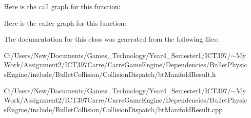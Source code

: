 Here is the call graph for this function:

Here is the caller graph for this function:

The documentation for this class was generated from the following files:\begin{CompactItemize}
\item 
C:/Users/New/Documents/Games\_\-Technology/Year4\_\-Semester1/ICT397/$\sim$My Work/Assignment2/ICT397Carre/CarreGameEngine/Dependencies/BulletPhysicsEngine/include/BulletCollision/CollisionDispatch/btManifoldResult.h\item 
C:/Users/New/Documents/Games\_\-Technology/Year4\_\-Semester1/ICT397/$\sim$My Work/Assignment2/ICT397Carre/CarreGameEngine/Dependencies/BulletPhysicsEngine/include/BulletCollision/CollisionDispatch/btManifoldResult.cpp\end{CompactItemize}
